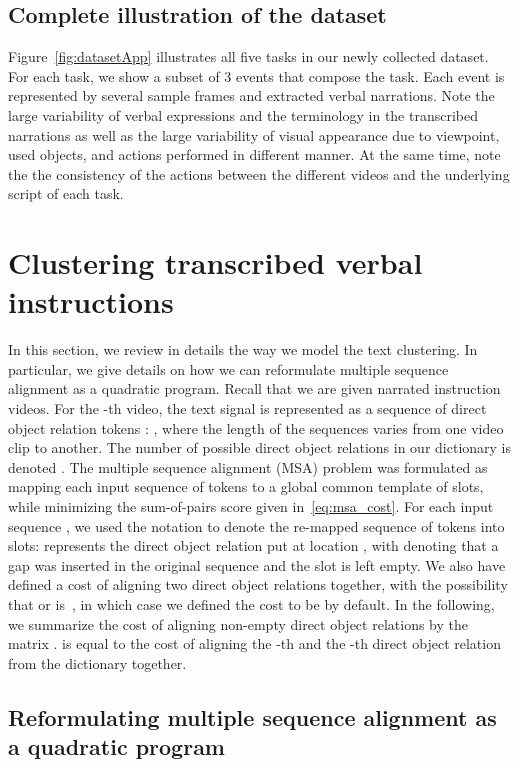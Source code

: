 \documentclass[10pt,twocolumn,letterpaper]{article}
\begin{document}
\subsection{Complete illustration of the dataset}

Figure~\ref{fig:datasetApp} illustrates all five tasks in our newly collected dataset.
For each task, we show a subset of 3 events that compose the task.
Each event is represented by several sample frames and extracted verbal narrations.
Note the large variability of verbal expressions and the terminology in the transcribed narrations as well as the large variability of visual appearance  due to viewpoint, used objects, and actions performed in different manner.
At the same time, note the the consistency of the actions between the different videos and the underlying script of each task.



\section{Clustering transcribed verbal instructions}
\label{app:text_msa}
In this section, we review in details the way we model the text clustering.
In particular, we give details on how we can reformulate multiple sequence alignment as a quadratic program.
Recall that we are given  narrated instruction videos.
For the -th video, the text signal is represented as a sequence of direct object relation tokens : , where the length  of the sequences varies from one video clip to another.
The number of possible direct object relations in our dictionary is denoted .
The multiple sequence alignment (MSA) problem was formulated
as mapping each input sequence  of tokens to a global common
template of  slots, while minimizing the sum-of-pairs score given in~\eqref{eq:msa_cost}.
For each input sequence , we used the notation 
to denote the re-mapped sequence of tokens into  slots: 
represents the direct object relation put at location , with 
denoting that a gap was inserted in the original sequence and
the slot  is left empty.
We also have defined a cost  of aligning two direct object 
relations together, with the possibility that  or 
is~, in which case we defined the cost to be 
by default.
In the following, we summarize the cost of aligning non-empty
direct object relations
by the matrix .
 is equal to the cost of aligning the -th and the 
-th direct object relation from the dictionary together.


\subsection{Reformulating multiple sequence alignment as a quadratic program}
\label{subsec:details_msa}
\end{document}
